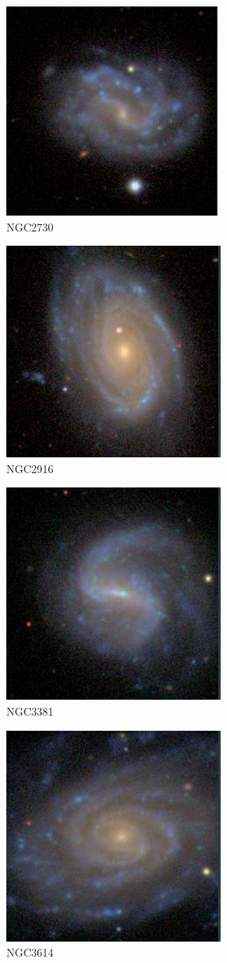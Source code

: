 \documentclass[9pt]{revtex4-1}
\begin{document}
\begin{figure}
\includegraphics[scale=0.3]{NGC2730.png}
\caption{NGC2730}
\end{figure}
\begin{figure}
\includegraphics[scale=0.3]{NGC2916.png}
\caption{NGC2916}
\end{figure}
\begin{figure}
\includegraphics[scale=0.3]{NGC3381.png}
\caption{NGC3381}
\end{figure}
\begin{figure}
\includegraphics[scale=0.3]{NGC3614.png}
\caption{NGC3614}
\end{figure}
\end{document}
